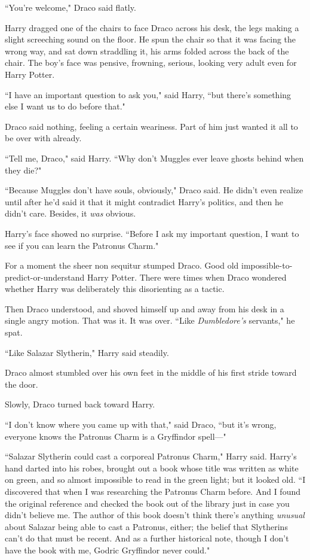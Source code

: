 ``You're welcome," Draco said flatly.

Harry dragged one of the chairs to face Draco across his desk, the legs making a slight screeching sound on the floor. He spun the chair so that it was facing the wrong way, and sat down straddling it, his arms folded across the back of the chair. The boy's face was pensive, frowning, serious, looking very adult even for Harry Potter.

``I have an important question to ask you," said Harry, ``but there's something else I want us to do before that."

Draco said nothing, feeling a certain weariness. Part of him just wanted it all to be over with already.

``Tell me, Draco," said Harry. ``Why don't Muggles ever leave ghosts behind when they die?"

``Because Muggles don't have souls, obviously," Draco said. He didn't even realize until after he'd said it that it might contradict Harry's politics, and then he didn't care. Besides, it \emph{was} obvious.

Harry's face showed no surprise. ``Before I ask my important question, I want to see if you can learn the Patronus Charm."

For a moment the sheer non sequitur stumped Draco. Good old impossible-to-predict-or-understand Harry Potter. There were times when Draco wondered whether Harry was deliberately this disorienting as a tactic.

Then Draco understood, and shoved himself up and away from his desk in a single angry motion. That was it. It was over. ``Like \emph{Dumbledore's} servants," he spat.

``Like Salazar Slytherin," Harry said steadily.

Draco almost stumbled over his own feet in the middle of his first stride toward the door.

Slowly, Draco turned back toward Harry.

``I don't know where you came up with that," said Draco, ``but it's wrong, everyone knows the Patronus Charm is a Gryffindor spell—"

``Salazar Slytherin could cast a corporeal Patronus Charm," Harry said. Harry's hand darted into his robes, brought out a book whose title was written as white on green, and so almost impossible to read in the green light; but it looked old. ``I discovered that when I was researching the Patronus Charm before. And I found the original reference and checked the book out of the library just in case you didn't believe me. The author of this book doesn't think there's anything \emph{unusual} about Salazar being able to cast a Patronus, either; the belief that Slytherins can't do that must be recent. And as a further historical note, though I don't have the book with me, Godric Gryffindor never could."

